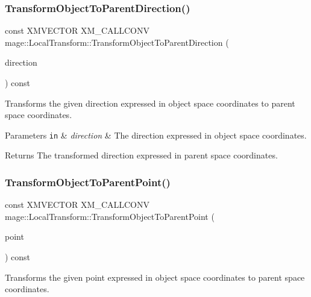 \subsubsection{\texorpdfstring{Transform\+Object\+To\+Parent\+Direction()}{TransformObjectToParentDirection()}}
{\footnotesize\ttfamily const X\+M\+V\+E\+C\+T\+OR X\+M\+\_\+\+C\+A\+L\+L\+C\+O\+NV mage\+::\+Local\+Transform\+::\+Transform\+Object\+To\+Parent\+Direction (\begin{DoxyParamCaption}\item[{F\+X\+M\+V\+E\+C\+T\+OR}]{direction }\end{DoxyParamCaption}) const\hspace{0.3cm}{\ttfamily [noexcept]}}

Transforms the given direction expressed in object space coordinates to parent space coordinates.


\begin{DoxyParams}[1]{Parameters}
\mbox{\tt in}  & {\em direction} & The direction expressed in object space coordinates. \\
\hline
\end{DoxyParams}
\begin{DoxyReturn}{Returns}
The transformed direction expressed in parent space coordinates. 
\end{DoxyReturn}
\mbox{\label{classmage_1_1_local_transform_a5df12629f26c4bf4d95728333d415d53}} 
\subsubsection{\texorpdfstring{Transform\+Object\+To\+Parent\+Point()}{TransformObjectToParentPoint()}}
{\footnotesize\ttfamily const X\+M\+V\+E\+C\+T\+OR X\+M\+\_\+\+C\+A\+L\+L\+C\+O\+NV mage\+::\+Local\+Transform\+::\+Transform\+Object\+To\+Parent\+Point (\begin{DoxyParamCaption}\item[{F\+X\+M\+V\+E\+C\+T\+OR}]{point }\end{DoxyParamCaption}) const\hspace{0.3cm}{\ttfamily [noexcept]}}

Transforms the given point expressed in object space coordinates to parent space coordinates.



